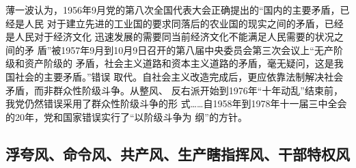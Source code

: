 薄一波认为，1956年9月党的第八次全国代表大会正确提出的``国内的主要矛盾，已经是人民
对于建立先进的工业国的要求同落后的农业国的现实之间的矛盾，已经是人民对于经济文化
迅速发展的需要同当前经济文化不能满足人民需要的状况之间的矛
盾''被1957年9月到10月9日召开的第八届中央委员会第三次会议上``无产阶级和资产阶级的
矛盾，社会主义道路和资本主义道路的矛盾，毫无疑问，这是我国社会的主要矛盾。''错误
取代。自社会主义改造完成后，更应依靠法制解决社会矛盾，而非群众性阶级斗争。从整风、
反右派开始到1976年``十年动乱''结束前，我党仍然错误采用了群众性阶级斗争的形
式……自1958年到1978年十一届三中全会的20年，党和国家错误实行了``以阶级斗争为
纲''的方针。


\subsection{浮夸风、命令风、共产风、生产瞎指挥风、干部特权风}


